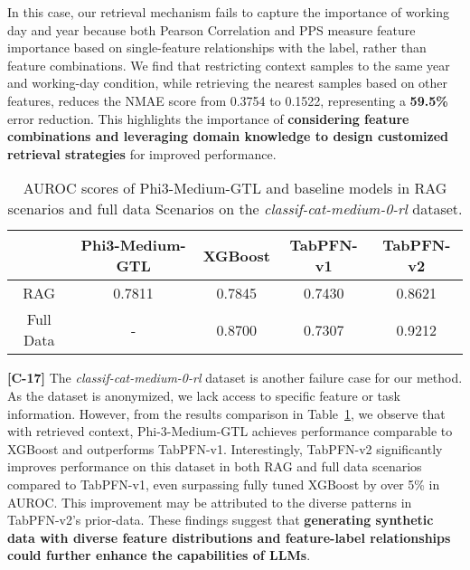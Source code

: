 In this case, our retrieval mechanism fails to capture the importance of working day and year because both Pearson Correlation and PPS measure feature importance based on single-feature relationships with the label, rather than feature combinations. We find that restricting context samples to the same year and working-day condition, while retrieving the nearest samples based on other features, reduces the NMAE score from 0.3754 to 0.1522, representing a \textbf{59.5\%} error reduction. This highlights the importance of \textbf{considering feature combinations and leveraging domain knowledge to design customized retrieval strategies} for improved performance.

\begin{table}
\centering
\caption{AUROC scores of Phi3-Medium-GTL and baseline models in RAG scenarios and full data Scenarios on the \textit{classif-cat-medium-0-rl} dataset.}
\label{tab:rl_results}
\begin{tabular}{c|cccc}
\hline
          & Phi3-Medium-GTL & XGBoost & TabPFN-v1 & TabPFN-v2 \\ \hline
RAG       & 0.7811          & 0.7845  & 0.7430    & 0.8621    \\
Full Data & -               & 0.8700  & 0.7307    & 0.9212    \\ \hline
\end{tabular}
\end{table}

\textbf{[C-17]} The \textit{classif-cat-medium-0-rl} dataset is another failure case for our method. As the dataset is anonymized, we lack access to specific feature or task information. However, from the results comparison in Table~\ref{tab:rl_results}, we observe that with retrieved context, Phi-3-Medium-GTL achieves performance comparable to XGBoost and outperforms TabPFN-v1. Interestingly, TabPFN-v2 significantly improves performance on this dataset in both RAG and full data scenarios compared to TabPFN-v1, even surpassing fully tuned XGBoost by over 5\% in AUROC. This improvement may be attributed to the diverse patterns in TabPFN-v2's prior-data. These findings suggest that \textbf{generating synthetic data with diverse feature distributions and feature-label relationships could further enhance the capabilities of LLMs}.




